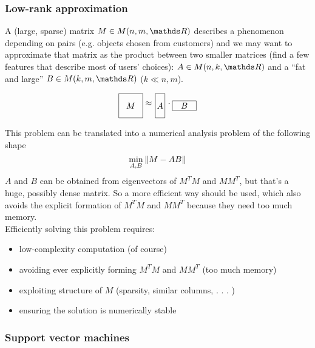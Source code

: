 \documentclass[ComputationalMathematics.tex]{subfiles}
\begin{document}
\subsubsection{Low-rank approximation}
A (large, sparse) matrix $M \in M(n, m, \R)$ describes a phenomenon depending
on pairs (e.g. objects chosen from customers) and we may want to approximate that matrix as the product between two smaller matrices (find a few features that describe most of users' choices): $A\in M(n, k, \R)$ and a ``fat and large'' $B\in M(k, m, \R)$ ($k\ll n, m$).

\[
  \begin{tikzpicture}[baseline=(current bounding box.center)]
    \draw (0,0) rectangle (1,1);
    \node at (0.5,0.5) {$M$};
  \end{tikzpicture}
  \approx
  \begin{tikzpicture}[baseline=(current bounding box.center)]
    \draw (0,0) rectangle (0.4,1);
    \node at (0.2,0.5) {$A$};
  \end{tikzpicture}
  \cdot
  \begin{tikzpicture}[baseline=(current bounding box.center)]
    \draw (0,0) rectangle (1,0.4);
    \node at (0.5,0.2) {$B$};
  \end{tikzpicture}
\]

This problem can be translated into a numerical analysis problem of the following shape
\[
  \min_{A, B} \left\lVert M - AB\right\rVert
\]
$A$ and $B$ can be obtained from eigenvectors of $M^TM$ and $MM^T$, but that's a huge, possibly dense matrix. So a more efficient way should be used, which also avoids the explicit formation of $M^TM$ and $MM^T$ because they need too much memory.\\

\noindent Efficiently solving this problem requires:
\begin{itemize}
    \item low-complexity computation (of course)
    \item avoiding ever explicitly forming $M^T M$ and $MM^T$ (too much memory)
    \item exploiting structure of $M$ (sparsity, similar columns, . . . )
    \item ensuring the solution is numerically stable
\end{itemize}

\subsubsection{Support vector machines}
\end{document}
